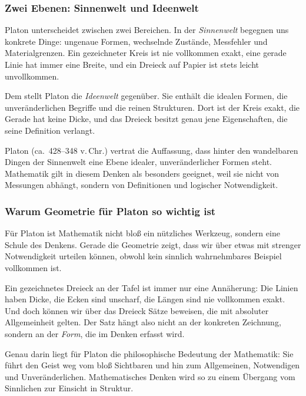 \subsubsection*{Zwei Ebenen: Sinnenwelt und Ideenwelt}

Platon unterscheidet zwischen zwei Bereichen.
In der \emph{Sinnenwelt} begegnen uns konkrete Dinge:
ungenaue Formen,
wechselnde Zustände,
Messfehler und Materialgrenzen.
Ein gezeichneter Kreis ist nie vollkommen exakt,
eine gerade Linie hat immer eine Breite,
und ein Dreieck auf Papier ist stets leicht unvollkommen.

Dem stellt Platon die \emph{Ideenwelt} gegenüber.
Sie enthält die idealen Formen,
die unveränderlichen Begriffe
und die reinen Strukturen.
Dort ist der Kreis exakt,
die Gerade hat keine Dicke,
und das Dreieck besitzt genau jene Eigenschaften,
die seine Definition verlangt.

\begin{HistoryBox}
	\label{box:platon-ideenwelt}
	\small
	Platon (ca.\ 428--348 v.\,Chr.) vertrat die Auffassung,
	dass hinter den wandelbaren Dingen der Sinnenwelt
	eine Ebene idealer,
	unveränderlicher Formen steht.
	Mathematik gilt in diesem Denken als besonders geeignet,
	weil sie nicht von Messungen abhängt,
	sondern von Definitionen und logischer Notwendigkeit.
\end{HistoryBox}

\subsubsection*{Warum Geometrie für Platon so wichtig ist}

Für Platon ist Mathematik nicht bloß ein nützliches Werkzeug,
sondern eine Schule des Denkens.
Gerade die Geometrie zeigt,
dass wir über etwas mit strenger Notwendigkeit urteilen können,
obwohl kein sinnlich wahrnehmbares Beispiel vollkommen ist.

Ein gezeichnetes Dreieck an der Tafel ist immer nur eine Annäherung:
Die Linien haben Dicke,
die Ecken sind unscharf,
die Längen sind nie vollkommen exakt.
Und doch können wir über das Dreieck Sätze beweisen,
die mit absoluter Allgemeinheit gelten.
Der Satz hängt also nicht an der konkreten Zeichnung,
sondern an der \emph{Form},
die im Denken erfasst wird.

Genau darin liegt für Platon die philosophische Bedeutung der Mathematik:
Sie führt den Geist weg vom bloß Sichtbaren
und hin zum Allgemeinen,
Notwendigen und Unveränderlichen.
Mathematisches Denken wird so zu einem Übergang
vom Sinnlichen zur Einsicht in Struktur.

